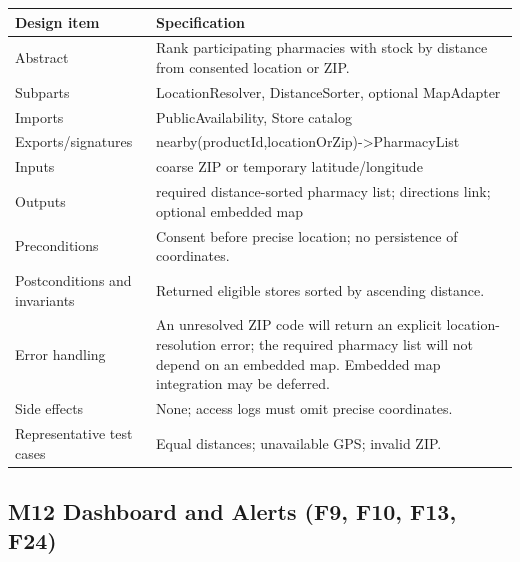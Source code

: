 {\def\LTcaptype{none} %
\begin{longtable}[]{|
  >{\raggedright\arraybackslash}m{}|
  >{\raggedright\arraybackslash}m{}|}
\hline
\begin{minipage}[c]{\linewidth}\raggedright
\textbf{Design item}
\end{minipage} & \begin{minipage}[c]{\linewidth}\raggedright
\textbf{Specification}
\end{minipage} \\
\hline
\endhead

\endlastfoot
Abstract & Rank participating pharmacies with stock by distance from consented location or ZIP. \\ \hline
Subparts & LocationResolver, DistanceSorter, optional MapAdapter \\ \hline
Imports & PublicAvailability, Store catalog \\ \hline
Exports/signatures & nearby(productId,locationOrZip)-\textgreater PharmacyList \\ \hline
Inputs & coarse ZIP or temporary latitude/longitude \\ \hline
Outputs & required distance-sorted pharmacy list; directions link; optional embedded map \\ \hline
Preconditions & Consent before precise location; no persistence of coordinates. \\ \hline
Postconditions and invariants & Returned eligible stores sorted by ascending distance. \\ \hline
Error handling & An unresolved ZIP code will return an explicit location-resolution error; the required pharmacy list will not depend on an embedded map. Embedded map integration may be deferred. \\ \hline
Side effects & None; access logs must omit precise coordinates. \\ \hline
Representative test cases & Equal distances; unavailable GPS; invalid ZIP. \\ \hline
\end{longtable}
}

\subsection{M12 Dashboard and Alerts (F9, F10, F13, F24)}\label{m12-dashboard-and-alerts-f9-f10-f13-f24}

